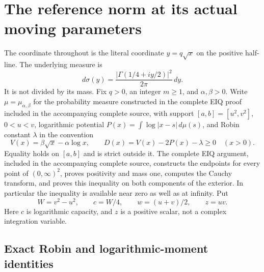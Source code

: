 \documentclass[11pt,a4paper]{article}
\begin{document}
\clearpage
\label{MTBUILD:GRE_COMPLETE_PREREQUISITE:start}
\clearpage
\label{GRBUILD:REFERENCE_NORM_PROOF:start}
\section{The reference norm at its actual moving parameters}
\label{GRE:section}

The coordinate throughout is the literal coordinate $y=q\sqrt x$ on
the positive half-line. The underlying measure is
\[
 d\sigma(y)=\frac{|\Gamma(1/4+iy/2)|^2}{2\pi}\,dy.
 \tag{GRE1}
\]
It is not divided by its mass. Fix $q>0$, an integer $m\ge1$, and
$\alpha,\beta>0$. Write $\mu=\mu_{\alpha,\beta}$ for the probability
measure constructed in the complete EIQ proof included in the accompanying complete source, with
support $[a,b]=[u^2,v^2]$, $0<u<v$, logarithmic potential
$P(x)=\int\log|x-s|\,d\mu(s)$, and Robin constant $\lambda$ in the
convention
\[
 V(x)=\beta\sqrt x-\alpha\log x,
 \qquad D(x)=V(x)-2P(x)-\lambda\ge0\quad(x>0).
 \tag{GRE2}
\]
Equality holds on $[a,b]$ and is strict outside it. The complete EIQ
argument, included in the accompanying complete source, constructs the endpoints
for every point of $(0,\infty)^2$, proves positivity and mass one,
computes the Cauchy transform, and proves this inequality on both
components of the exterior. In particular the inequality is available
near zero as well as at infinity. Put
\[
 W=v^2-u^2,\qquad c=W/4,\qquad w=(u+v)/2,\qquad z=uv.
 \tag{GRE3}
\]
Here $c$ is logarithmic capacity, and $z$ is a positive scalar, not
a complex integration variable.

\subsection{Exact Robin and logarithmic-moment identities}
\end{document}
